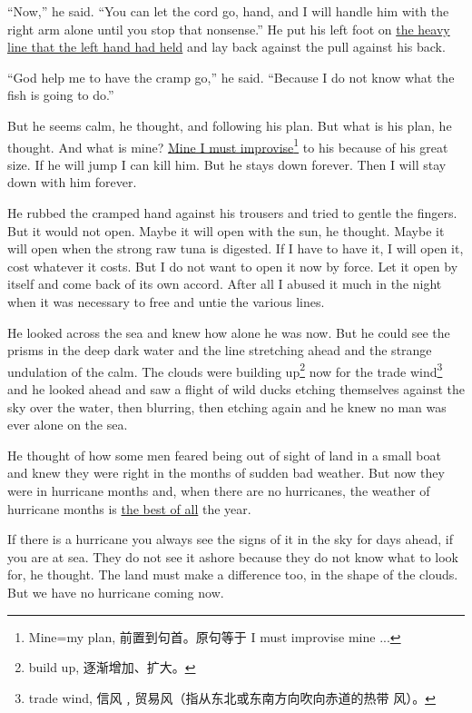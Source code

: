 ``Now,'' he said. ``You can let the cord go, hand, and I will handle him
with the right arm alone until you stop that \gls{nonsense}.'' He put his
left foot on \uline{the heavy line that the left hand had held} and lay back
against the pull against his back.

``God help me to have the cramp go,'' he said. ``Because I do not know what
the fish is going to do.''

But he seems calm, he thought, and following his plan. But what is his plan,
he thought. And what is mine? \uline{Mine I must improvise}\footnote{Mine=my
  plan, 前置到句首。原句等于 I must improvise mine ...} to his because of
his great size. If he will jump I can kill him. But he stays down forever.
Then I will stay down with him forever.

He \gls{rubbed} the cramped hand against his trousers and tried to gentle the
fingers. But it would not open. Maybe it will open with the sun, he thought.
Maybe it will open when the strong raw tuna is \gls{digested}. If I have to
have it, I will open it, cost whatever it costs. But I do not want to open
it now by force. Let it open by itself and come back of its own
\gls{accord}. After all I \gls{abused} it much in the night when it was
necessary to free and \gls{untie} the \gls{various} lines.

He looked across the sea and knew how alone he was now. But he could see the
prisms in the deep dark water and the line \gls{stretching} ahead and the
strange \gls{undulation} of the calm. The clouds were building
up\footnote{build up, 逐渐增加、扩大。} now for the trade
wind\footnote{trade wind, 信风﹐贸易风（指从东北或东南方向吹向赤道的热带
  风）。} and he looked ahead and saw a \gls{flight} of wild ducks \gls{etching}
themselves against the sky over the water, then \gls{blurring}, then etching again
and he knew no man was ever alone on the sea.

He thought of how some men \gls{feared} being out of sight of land in a
small boat and knew they were right in the months of sudden bad weather. But
now they were in \gls{hurricane} months and, when there are no hurricanes, the
weather of hurricane months is \uline{the best of all} the year.

If there is a hurricane you always see the signs of it in the sky for days
ahead, if you are at sea. They do not see it \gls{ashore} because they do not know
what to look for, he thought. The land must make a difference too, in the
shape of the clouds. But we have no hurricane coming now.


